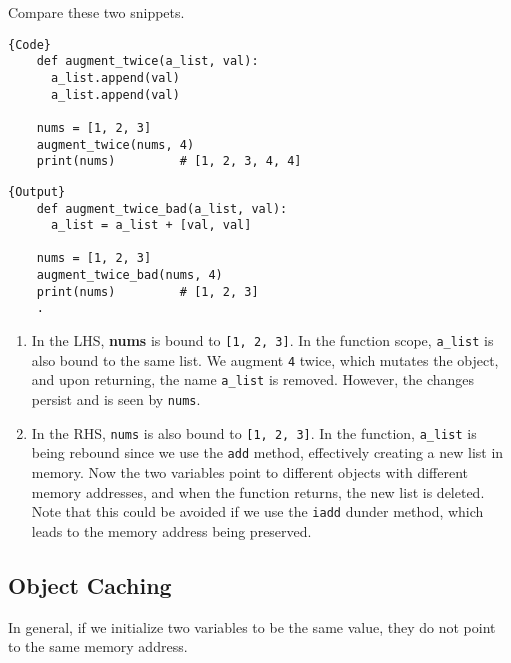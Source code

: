   Compare these two snippets. 

  \noindent\begin{minipage}{.5\textwidth}
  \begin{lstlisting}[]{Code}
    def augment_twice(a_list, val):
      a_list.append(val)
      a_list.append(val)

    nums = [1, 2, 3]
    augment_twice(nums, 4)
    print(nums)         # [1, 2, 3, 4, 4]
  \end{lstlisting}
  \end{minipage}
  \hfill
  \begin{minipage}{.49\textwidth}
  \begin{lstlisting}[]{Output}
    def augment_twice_bad(a_list, val):
      a_list = a_list + [val, val]

    nums = [1, 2, 3]
    augment_twice_bad(nums, 4)
    print(nums)         # [1, 2, 3]
    .
  \end{lstlisting}
  \end{minipage}

  \begin{enumerate}
    \item In the LHS, \textbf{nums} is bound to \texttt{[1, 2, 3]}. In the function scope, \texttt{a\_list} is also bound to the same list. We augment \texttt{4} twice, which mutates the object, and upon returning, the name \texttt{a\_list} is removed. However, the changes persist and is seen by \texttt{nums}. 
    \item In the RHS, \texttt{nums} is also bound to \texttt{[1, 2, 3]}. In the function, \texttt{a\_list} is being rebound since we use the \texttt{add} method, effectively creating a new list in memory. Now the two variables point to different objects with different memory addresses, and when the function returns, the new list is deleted. Note that this could be avoided if we use the \texttt{iadd} dunder method, which leads to the memory address being preserved. 
  \end{enumerate}

\subsection{Object Caching}

  In general, if we initialize two variables to be the same value, they do not point to the same memory address. 

